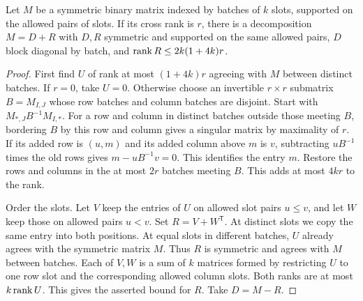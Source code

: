 \begin{lemma}\label{lem:ordered-slot-completion}
Let \(M\) be a symmetric binary matrix indexed by batches of \(k\)
slots, supported on the allowed pairs of slots. If its cross rank is
\(r\), there is a decomposition \(M=D+R\) with \(D,R\) symmetric and supported on the
same allowed pairs, \(D\) block diagonal by batch, and
\(\operatorname{rank} R\le2k(1+4k)r\).
\end{lemma}
\begin{proof}
First find \(U\) of rank at most \((1+4k)r\) agreeing with \(M\)
between distinct batches. If \(r=0\), take \(U=0\). Otherwise choose an
invertible \(r\times r\) submatrix \(B=M_{I,J}\) whose row batches
and column batches are disjoint. Start with \(M_{*,J}B^{-1}M_{I,*}\).
For a row and column in distinct batches outside those meeting \(B\),
bordering \(B\) by this row and column gives a singular matrix by
maximality of \(r\). If its added row is \((u,m)\) and its added
column above \(m\) is \(v\), subtracting \(uB^{-1}\) times the old
rows gives \(m-uB^{-1}v=0\). This identifies the entry \(m\).
Restore the rows and columns in the at most \(2r\) batches meeting
\(B\). This adds at most \(4kr\) to the rank.

Order the slots. Let \(V\) keep the entries of \(U\) on allowed slot
pairs \(u\le v\), and let \(W\) keep those on allowed pairs \(u<v\).
Set \(R=V+W^{\mathsf T}\). At distinct slots we copy the same entry
into both positions. At equal slots in different batches, \(U\)
already agrees with the symmetric matrix \(M\). Thus \(R\) is symmetric
and agrees with \(M\) between batches. Each of \(V,W\) is a sum of
\(k\) matrices formed by restricting \(U\) to one row slot and the
corresponding allowed column slots. Both ranks are at most \(k\operatorname{rank} U\).
This gives the asserted bound for \(R\). Take \(D=M-R\).
\end{proof}

